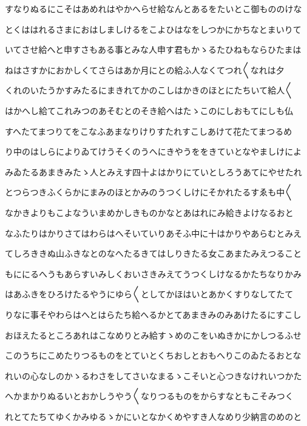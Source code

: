 \documentclass[a4paper,11pt,landscape]{ltjtarticle}
\begin{document}
\par\medskip
すなりぬるにこそはあめれはやかへらせ給なんとあるをたいとこ御もののけな
\par\medskip
とくははれるさまにおはしましけるをこよひはなをしつかにかちなとまいりて
\par\medskip
いてさせ給へと申すさもある事とみな人申す君もかゝるたひねもならひたまは
\par\medskip
ねはさすかにおかしくてさらはあか月にとの給ふ人なくてつれ〱なれは夕
\par\medskip
くれのいたうかすみたるにまきれてかのこしはかきのほとにたちいて給人〱
\par\medskip
はかへし給てこれみつのあそむとのそき給へはたゝこのにしおもてにしも仏
\par\medskip
すへたてまつりてをこなふあまなりけりすたれすこしあけて花たてまつるめ
\par\medskip
り中のはしらによりゐてけうそくのうへにきやうををきていとなやましけによ
\par\medskip
みゐたるあまきみたゝ人とみえす四十よはかりにていとしろうあてにやせたれ
\par\medskip
とつらつきふくらかにまみのほとかみのうつくしけにそかれたるすゑも中〱
\par\medskip
なかきよりもこよなういまめかしきものかなとあはれにみ給きよけなるおと
\par\medskip
なふたりはかりさてはわらはへそいていりあそふ中に十はかりやあらむとみえ
\par\medskip
てしろききぬ山ふきなとのなへたるきてはしりきたる女こあまたみえつること
\par\medskip
もににるへうもあらすいみしくおいさきみえてうつくしけなるかたちなりかみ
\par\medskip
はあふきをひろけたるやうにゆら〱としてかほはいとあかくすりなしてたて
\par\medskip
りなに事そやわらはへとはらたち給へるかとてあまきみのみあけたるにすこし
\par\medskip
おほえたるところあれはこなめりとみ給すゝめのこをいぬきかにかしつるふせ
\par\medskip
このうちにこめたりつるものをとていとくちおしとおもへりこのゐたるおとな
\par\medskip
れいの心なしのかゝるわさをしてさいなまるゝこそいと心つきなけれいつかた
\par\medskip
へかまかりぬるいとおかしうやう〱なりつるものをからすなともこそみつく
\par\medskip
れとてたちてゆくかみゆるゝかにいとなかくめやすき人なめり少納言のめのと
\par\medskip
\end{document}
